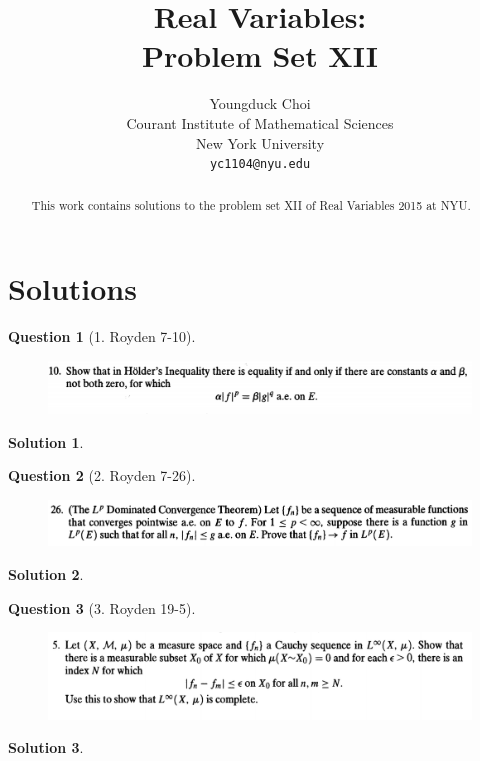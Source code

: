 \documentclass{article} %
\title{Real Variables: \\
Problem Set XII}
\author{
Youngduck Choi \\
Courant Institute of Mathematical Sciences \\
New York University \\
\texttt{yc1104@nyu.edu} \\
}
\theoremstyle{quest}
\newtheorem*{question}{Question}
\newtheorem*{solution}{Solution}
\begin{document}
\maketitle

\begin{abstract}
This work contains solutions to the problem set 
XII of Real Variables 2015 at NYU.
\end{abstract}

\section{Solutions}

\begin{question}[1. Royden 7-10]
\hfill
\begin{figure}[h!]
  \centering
    \includegraphics[width=1\textwidth]{7-10.png}
\end{figure}
\end{question}
\begin{solution}

\end{solution}

\newpage

\begin{question}[2. Royden 7-26]
\hfill
\begin{figure}[h!]
  \centering
    \includegraphics[width=1\textwidth]{7-26.png}
\end{figure}
\end{question}
\begin{solution}
\end{solution}

\newpage

\begin{question}[3. Royden 19-5]
\hfill
\begin{figure}[h!]
  \centering
    \includegraphics[width=1\textwidth]{19-5.png}
\end{figure}
\end{question}
\begin{solution}
\end{solution}
\end{document}
